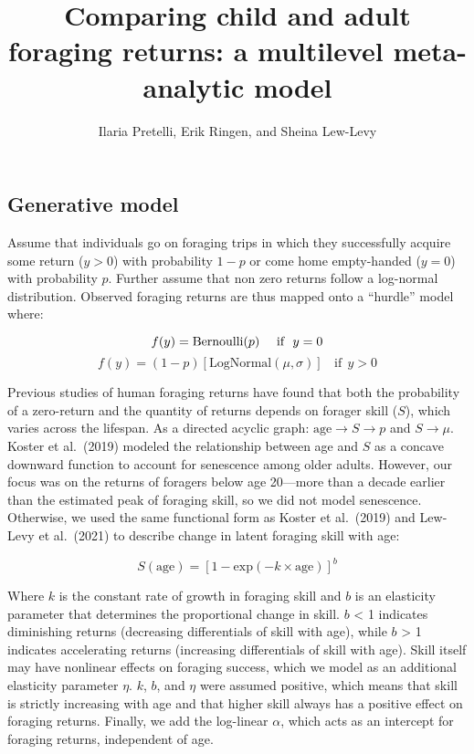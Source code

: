 \documentclass[
]{article}
\title{Comparing child and adult foraging returns: a multilevel meta-analytic
model}
\author{Ilaria Pretelli, Erik Ringen, and Sheina Lew-Levy}
\date{}
\begin{document}
\maketitle

\hypertarget{generative-model}{%
\subsection{Generative model}\label{generative-model}}

Assume that individuals go on foraging trips in which they successfully
acquire some return (\(y > 0\)) with probability \(1-p\) or come home
empty-handed (\(y = 0\)) with probability \(p\). Further assume that non
zero returns follow a log-normal distribution. Observed foraging returns
are thus mapped onto a ``hurdle'' model where:

\[ f(y) = \textrm{Bernoulli}(p)  ~~~~\textrm{if}~~y=0 \\ \]
\[ f(y) = (1-p) [\textrm{LogNormal}(\mu,\sigma)] ~~~~\textrm{if}~~y>0  \]

Previous studies of human foraging returns have found that both the
probability of a zero-return and the quantity of returns depends on
forager skill (\(S\)), which varies across the lifespan. As a directed
acyclic graph: \(\textrm{age} \rightarrow S \rightarrow p\) and
\(S \rightarrow \mu\). Koster et al.~(2019) modeled the relationship
between age and \(S\) as a concave downward function to account for
senescence among older adults. However, our focus was on the returns of
foragers below age 20---more than a decade earlier than the estimated
peak of foraging skill, so we did not model senescence. Otherwise, we
used the same functional form as Koster et al.~(2019) and Lew-Levy et
al.~(2021) to describe change in latent foraging skill with age:

\[S(\textrm{age}) = [1 - \textrm{exp}(-k\times \textrm{age})]^{b}\]

Where \(k\) is the constant rate of growth in foraging skill and \(b\)
is an elasticity parameter that determines the proportional change in
skill. \(b\) \textless{} 1 indicates diminishing returns (decreasing
differentials of skill with age), while \(b\) \textgreater{} 1 indicates
accelerating returns (increasing differentials of skill with age). Skill
itself may have nonlinear effects on foraging success, which we model as
an additional elasticity parameter \(\eta\). \(k\), \(b\), and \(\eta\)
were assumed positive, which means that skill is strictly increasing
with age and that higher skill always has a positive effect on foraging
returns. Finally, we add the log-linear \(\alpha\), which acts as an
intercept for foraging returns, independent of age.
\end{document}
